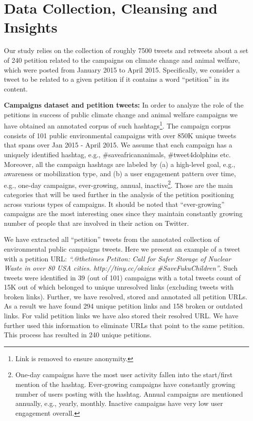 \section{Data Collection, Cleansing and Insights}
\label{sec:dataset}

Our study relies on the collection of roughly 7500 tweets and retweets about a set of 240 petition related to the campaigns on climate change and animal welfare, which were posted from January 2015 to April 2015. Specifically, we consider a tweet to be related to a given petition if it contains a word ``petition'' in its content.

\textbf{Campaigns dataset and petition tweets:}
In order to analyze the role of the petitions in success of public climate change and animal welfare campaigns
we have obtained an annotated corpus of such hashtags\footnote{Link is removed to ensure anonymity.}.
The campaign corpus consists of 101 public environmental campaigns with over 850K unique tweets that spans over Jan 2015 - April 2015. 
We assume that each campaign has a uniquely identified hashtag, e.g., \#saveafricananimals, \#tweet4dolphins etc.
Moreover, all the campaign hashtags are labeled by (a) a high-level goal, e.g., awareness or mobilization type, and (b) a user engagement pattern over time, e.g., one-day campaigns, ever-growing, annual, inactive\footnote{One-day campaigns have the most user activity fallen into the start/first mention of the hashtag.
Ever-growing campaigns have constantly growing number of users posting with the hashtag.
Annual campaigns are mentioned annually, e.g., yearly, monthly. Inactive campaigns have very low user engagement overall.}.
Those are the main categories that will be used further in the analysis of the petition positioning across various types of campaigns. It should be noted that ``ever-growing'' campaigns are the most interesting ones since they maintain constantly growing number of people that are involved in their action on Twitter.

We have extracted all ``petition'' tweets from the annotated collection of environmental public campaigns tweets.
Here we present an example of a tweet with a petition URL: \textit{``.@thetimes Petiton: Call for Safer Storage of Nuclear Waste in over 80 USA cities. http://tiny.cc/okzicx  \#SaveFukuChildren''}.
Such tweets were identified in 39 (out of 101) campaigns with a total tweets count of 15K out of which belonged to unique unresolved links (excluding tweets with broken links).
Further, we have resolved, stored and annotated all petition URLs. As a result we have found 294 unique petition links and 158 broken or outdated links.
For valid petition links we have also stored their resolved URL. We have further used this information to eliminate URLs that point to the same petition.
This process has resulted in 240 unique petitions.

